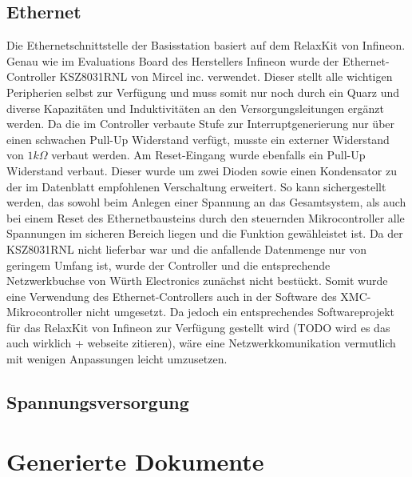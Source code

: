 \subsection{Ethernet}
Die Ethernetschnittstelle der Basisstation basiert auf dem RelaxKit von Infineon. Genau wie im Evaluations Board des Herstellers Infineon wurde der Ethernet-Controller KSZ8031RNL von Mircel inc. verwendet. Dieser stellt alle wichtigen Peripherien selbst zur Verfügung und muss somit nur noch durch ein Quarz und diverse Kapazitäten und Induktivitäten an den Versorgungsleitungen ergänzt werden. Da die im Controller verbaute Stufe zur Interruptgenerierung nur über einen schwachen Pull-Up Widerstand verfügt, musste ein externer Widerstand von $1k\Omega$ verbaut werden. Am Reset-Eingang wurde ebenfalls ein Pull-Up Widerstand verbaut. Dieser wurde um zwei Dioden sowie einen Kondensator zu der im Datenblatt empfohlenen Verschaltung erweitert. So kann sichergestellt werden, das sowohl beim Anlegen einer Spannung an das Gesamtsystem, als auch bei einem Reset des Ethernetbausteins durch den steuernden Mikrocontroller alle Spannungen im sicheren Bereich liegen und die Funktion gewähleistet ist. 
Da der KSZ8031RNL  nicht lieferbar war und die anfallende Datenmenge nur von geringem Umfang ist, wurde der Controller und die entsprechende Netzwerkbuchse von Würth Electronics zunächst nicht bestückt. Somit wurde eine Verwendung des Ethernet-Controllers auch in der Software des XMC-Mikrocontroller nicht umgesetzt. Da jedoch ein entsprechendes Softwareprojekt für das RelaxKit von Infineon zur Verfügung gestellt wird (TODO wird es das auch wirklich + webseite zitieren), wäre eine Netzwerkkomunikation vermutlich mit wenigen Anpassungen leicht umzusetzen. 








\subsection{Spannungsversorgung}
\section{Generierte Dokumente}